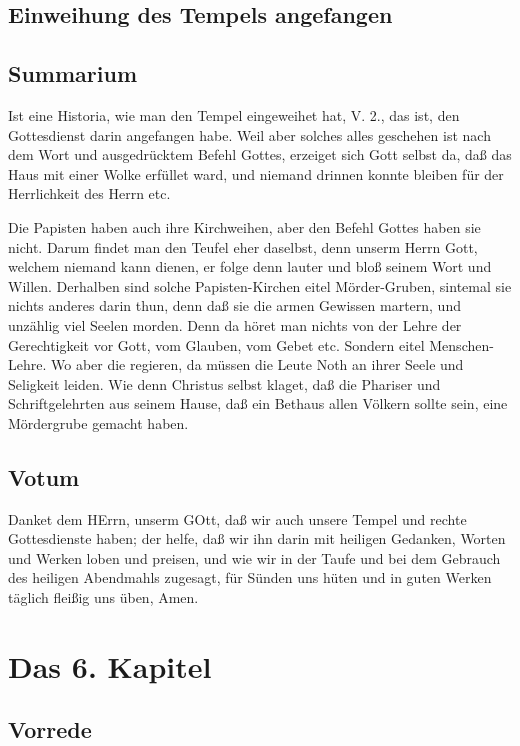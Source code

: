 \section[Einweihung des Tempels angefangen]{Einweihung des Tempels angefangen}

\section{Summarium}

Ist eine Historia, wie man den Tempel eingeweihet hat, V. 2., das ist, den Gottesdienst darin angefangen habe. Weil aber solches alles geschehen ist nach dem Wort und ausgedrücktem Befehl Gottes, erzeiget sich Gott selbst da, daß das Haus mit einer Wolke erfüllet ward, und niemand drinnen konnte bleiben für der Herrlichkeit des Herrn etc.

Die Papisten haben auch ihre Kirchweihen, aber den Befehl Gottes haben sie nicht. Darum findet man den Teufel eher daselbst, denn unserm Herrn Gott, welchem niemand kann dienen, er folge denn lauter und bloß seinem Wort und Willen. Derhalben sind solche Papisten-Kirchen eitel Mörder-Gruben, sintemal sie nichts anderes darin thun, denn daß sie die armen Gewissen martern, und unzählig viel Seelen morden. Denn da höret man nichts von der Lehre der Gerechtigkeit vor Gott, vom Glauben, vom Gebet etc. Sondern eitel Menschen-Lehre.
Wo aber die regieren, da müssen die Leute Noth an ihrer Seele und Seligkeit leiden. Wie denn Christus selbst klaget, daß die Phariser und Schriftgelehrten aus seinem Hause, daß ein Bethaus allen Völkern sollte sein, eine Mördergrube gemacht haben.

\section{Votum}

Danket dem HErrn, unserm GOtt, daß wir auch unsere Tempel und rechte Gottesdienste haben; der helfe, daß wir ihn darin mit heiligen Gedanken, Worten und Werken loben und preisen, und wie wir in der Taufe und bei dem Gebrauch des heiligen Abendmahls zugesagt, für Sünden uns hüten und in guten Werken täglich fleißig uns üben, Amen.

\chapter{Das 6. Kapitel}

\section{Vorrede}

